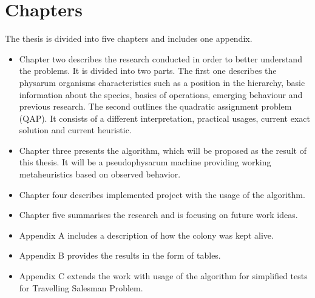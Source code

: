 \section{Chapters}
\label{section:introduction_chapters}

The thesis is divided into five chapters and includes one appendix.

\begin{itemize}
  \item Chapter two describes the research conducted in order to better understand the problems. It is divided into two parts. The first one describes the physarum organisms characteristics such as a position in the hierarchy, basic information about the species, basics of operations, emerging behaviour and previous research. The second outlines the quadratic assignment problem (QAP). It consists of a different interpretation, practical usages, current exact solution and current heuristic.
  \item Chapter three presents the algorithm, which will be proposed as the result of this thesis. It will be a pseudophysarum machine providing working metaheuristics based on observed behavior.
  \item Chapter four describes implemented project with the usage of the algorithm.
  \item Chapter five summarises the research and is focusing on future work ideas.
  \item Appendix A includes a description of how the colony was kept alive.
  \item Appendix B provides the results in the form of tables.
  \item Appendix C extends the work with usage of the algorithm for simplified tests for Travelling Salesman Problem.
\end{itemize}
